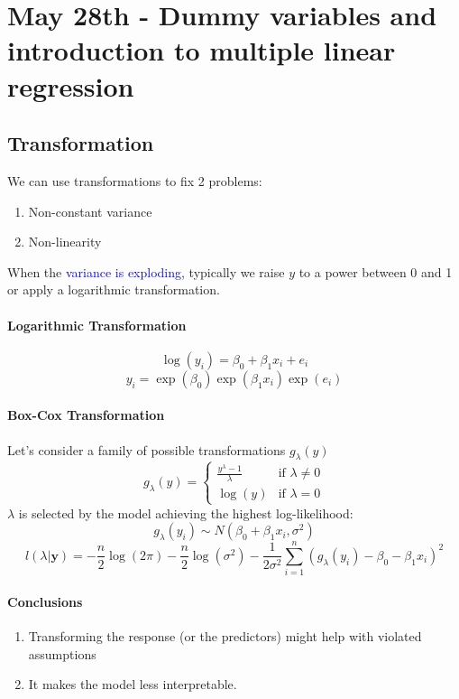 \documentclass[11pt]{article}
\newcommand{\tb}[1]{\textbf{#1}}
\newcommand{\vy}[0]{\tb{y}}
\begin{document}
\section{May 28th - Dummy variables and introduction to multiple linear regression}
\subsection{Transformation}
We can use transformations to fix 2 problems:
\begin{enumerate}
	\item Non-constant variance
	\item Non-linearity
\end{enumerate}
When the \textcolor{blue}{variance is exploding}, typically we raise $y$ to a power between 0 and 1 or apply a logarithmic transformation.
\paragraph{Logarithmic Transformation}
$$\log(y_i) = \beta_0 + \beta_1 x_i + e_i$$
$$y_i = \exp(\beta_0)\exp(\beta_1x_i)\exp(e_i)$$
\paragraph{Box-Cox Transformation}
Let's consider a family of possible transformations $g_\lambda(y)$
$$g_\lambda(y)=\begin{cases}
	\frac{y^\lambda-1}{\lambda} & \text{if $\lambda \neq 0$} \\
	\log(y) & \text{if $\lambda = 0$}
\end{cases}$$
$\lambda$ is selected by the model achieving the highest log-likelihood:
$$g_\lambda(y_i) \sim N(\beta_0 + \beta_1x_i, \sigma^2)$$
$$l(\lambda|\vy) = -\frac{n}{2}\log(2\pi) - \frac{n}{2}\log(\sigma^2) - \frac{1}{2\sigma^2}\sum_{i=1}^n(g_\lambda(y_i) - \beta_0 - \beta_1x_i)^2$$
\paragraph{Conclusions}
\begin{enumerate}
	\item Transforming the response (or the predictors) might help with violated assumptions
	\item It makes the model less interpretable.
\end{enumerate}
\end{document}
